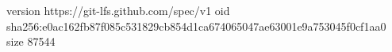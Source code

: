 version https://git-lfs.github.com/spec/v1
oid sha256:e0ac162fb87f085c531829cb854d1ca674065047ae63001e9a753045f0cf1aa0
size 87544

